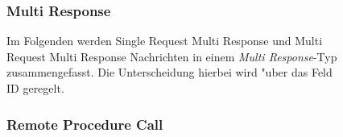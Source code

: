 \clearpage

\begin{figure}[h]
\subsubsection{\hspace{10mm} Multi Response}
Im Folgenden werden Single Request Multi Response und Multi Request Multi Response Nachrichten in einem \emph{Multi Response}-Typ zusammengefasst.
Die Unterscheidung hierbei wird "uber das Feld ID geregelt.

\end{figure}

\begin{figure}[h]
\subsubsection{Remote Procedure Call}

\end{figure}
